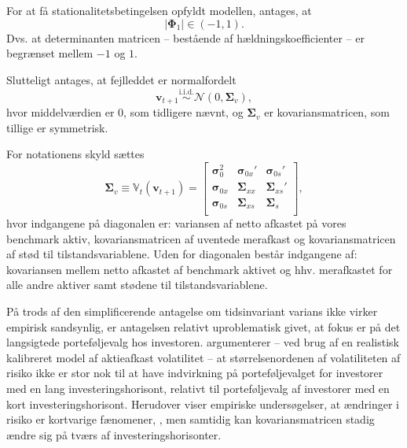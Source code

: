 \documentclass[
  a4paper,
  oneside]{memoir}
\begin{document}
\vspace{5mm}

For at få stationalitetsbetingelsen opfyldt modellen, antages, at
\begin{equation*}
        |\bm{\Phi}_1|\in(-1,1).
    \end{equation*}
Dvs. at determinanten matricen -- bestående af hældningskoefficienter -- er begrænset mellem \(-1\) og \(1\).

\vspace{5mm}

Slutteligt antages, at fejlleddet er normalfordelt
\begin{equation}\label{eq:2}
        \bm{v}_{t+1}\overset{\text{i.i.d.}}{\sim}\mathcal{N}(0,\bm{\Sigma}_v),
    \end{equation}
hvor middelværdien er \(0\), som tidligere nævnt, og \(\bm{\Sigma}_v\) er kovariansmatricen, som tillige er symmetrisk.

For notationens skyld sættes
\begin{equation*}
        \bm{\Sigma}_v\equiv \mathbb{V}_t(\bm{v}_{t+1})=
        \begin{bmatrix}
        \bm{\sigma}_0^2 & \bm{\sigma}_{0x}' & \bm{\sigma}_{0s}'\\
        \bm{\sigma}_{0x} & \bm{\Sigma}_{xx} & \bm{\Sigma}_{xs}'\\
        \bm{\sigma}_{0s} & \bm{\Sigma}_{xs} & \bm{\Sigma}_{s}\\
        \end{bmatrix},
    \end{equation*}
hvor indgangene på diagonalen er: variansen af netto afkastet på vores benchmark aktiv, kovariansmatricen af uventede merafkast og kovariansmatricen af stød til tilstandsvariablene. Uden for diagonalen består indgangene af: kovariansen mellem netto afkastet af benchmark aktivet og hhv. merafkastet for alle andre aktiver samt stødene til tilstandsvariablene.

\vspace{5mm}

På trods af den simplificerende antagelse om tidsinvariant varians ikke virker empirisk sandsynlig, er antagelsen relativt uproblematisk givet, at fokus er på det langsigtede porteføljevalg hos investoren. \citep{Chacko2005} argumenterer -- ved brug af en realistisk kalibreret model af aktieafkast volatilitet -- at størrelsenordenen af volatiliteten af risiko ikke er stor nok til at have indvirkning på porteføljevalget for investorer med en lang investeringshorisont, relativt til porteføljevalg af investorer med en kort investeringshorisont. Herudover viser empiriske undersøgelser, at ændringer i risiko er kortvarige fænomener, \citep{Camp1987}, men samtidig kan kovariansmatricen stadig ændre sig på tværs af investeringshorisonter.
\end{document}
